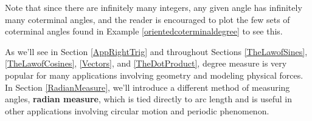 \documentclass{ximera}
\begin{document}
\begin{example}
\begin{enumerate}
\begin{image}
\end{image}
\end{enumerate}


\end{example}

Note that since there are infinitely many integers, any given angle has infinitely many coterminal angles, and the reader is encouraged to plot the few sets of coterminal angles found in Example \ref{orientedcoterminaldegree} to see this.  

\smallskip

As we'll see in Section \ref{AppRightTrig} and throughout Sections \ref{TheLawofSines}, \ref{TheLawofCosines}, \ref{Vectors}, and \ref{TheDotProduct}, degree measure is very popular for many applications involving geometry and modeling physical forces.  In Section \ref{RadianMeasure}, we'll introduce a different method of measuring angles, \textbf{radian measure}, which is tied directly to arc length and is useful in other applications involving circular motion and periodic phenomenon. 



\closegraphsfile
\end{document}

